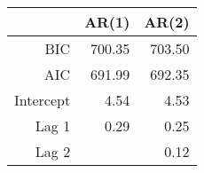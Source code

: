 \begin{table}[ht]
\centering
\begin{tabular}{rrr}
  \hline
 & AR(1) & AR(2) \\ 
  \hline
BIC & 700.35 & 703.50 \\ 
  AIC & 691.99 & 692.35 \\ 
  Intercept & 4.54 & 4.53 \\ 
  Lag 1 & 0.29 & 0.25 \\ 
  Lag 2 &  & 0.12 \\ 
   \hline
\end{tabular}
\end{table}
